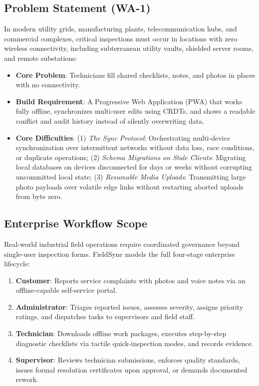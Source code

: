 \documentclass[conference]{IEEEtran}
\begin{document}
\subsection{Problem Statement (WA-1)}
In modern utility grids, manufacturing plants, telecommunication hubs, and commercial complexes, critical inspections must occur in locations with zero wireless connectivity, including subterranean utility vaults, shielded server rooms, and remote substations:
\begin{itemize}\setlength{\itemsep}{1pt}
    \item \textbf{Core Problem}: Technicians fill shared checklists, notes, and photos in places with no connectivity.
    \item \textbf{Build Requirement}: A Progressive Web Application (PWA) that works fully offline, synchronizes multi-user edits using CRDTs, and shows a readable conflict and audit history instead of silently overwriting data.
    \item \textbf{Core Difficulties}: 
    (1) \textit{The Sync Protocol}: Orchestrating multi-device synchronization over intermittent networks without data loss, race conditions, or duplicate operations;
    (2) \textit{Schema Migrations on Stale Clients}: Migrating local databases on devices disconnected for days or weeks without corrupting uncommitted local state;
    (3) \textit{Resumable Media Uploads}: Transmitting large photo payloads over volatile edge links without restarting aborted uploads from byte zero.
\end{itemize}

\subsection{Enterprise Workflow Scope}
Real-world industrial field operations require coordinated governance beyond single-user inspection forms. FieldSync models the full four-stage enterprise lifecycle:
\begin{enumerate}\setlength{\itemsep}{1pt}
    \item \textbf{Customer}: Reports service complaints with photos and voice notes via an offline-capable self-service portal.
    \item \textbf{Administrator}: Triages reported issues, assesses severity, assigns priority ratings, and dispatches tasks to supervisors and field staff.
    \item \textbf{Technician}: Downloads offline work packages, executes step-by-step diagnostic checklists via tactile quick-inspection modes, and records evidence.
    \item \textbf{Supervisor}: Reviews technician submissions, enforces quality standards, issues formal resolution certificates upon approval, or demands documented rework.
\end{enumerate}
\end{document}
